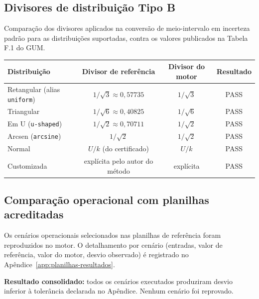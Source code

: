 \documentclass[11pt,a4paper]{article}
\begin{document}
\subsection{Divisores de distribuição Tipo B}

Comparação dos divisores aplicados na conversão de meio-intervalo em incerteza padrão para as distribuições suportadas, contra os valores publicados na Tabela F.1 do GUM.

\begin{table}[h]
  \centering
  \small
  \begin{tabularx}{\textwidth}{l c c c}
    \toprule
    \textbf{Distribuição} & \textbf{Divisor de referência} & \textbf{Divisor do motor} & \textbf{Resultado} \\
    \midrule
    Retangular (alias \texttt{uniform}) & \(1/\sqrt{3} \approx 0{,}57735\)   & \(1/\sqrt{3}\)   & PASS \\
    Triangular                          & \(1/\sqrt{6} \approx 0{,}40825\)   & \(1/\sqrt{6}\)   & PASS \\
    Em U (\texttt{u-shaped})            & \(1/\sqrt{2} \approx 0{,}70711\)   & \(1/\sqrt{2}\)   & PASS \\
    Arcsen (\texttt{arcsine})           & \(1/\sqrt{2}\)                     & \(1/\sqrt{2}\)   & PASS \\
    Normal                              & \(U/k\) (do certificado)           & \(U/k\)          & PASS \\
    Customizada                         & explícita pelo autor do método     & explícita        & PASS \\
    \bottomrule
  \end{tabularx}
\end{table}

\subsection{Comparação operacional com planilhas acreditadas}

Os cenários operacionais selecionados nas planilhas de referência foram reproduzidos no motor. O detalhamento por cenário (entradas, valor de referência, valor do motor, desvio observado) é registrado no Apêndice~\ref{app:planilhas-resultados}.

\textbf{Resultado consolidado:} todos os cenários executados produziram desvio inferior à tolerância declarada no Apêndice. Nenhum cenário foi reprovado.

\end{document}

